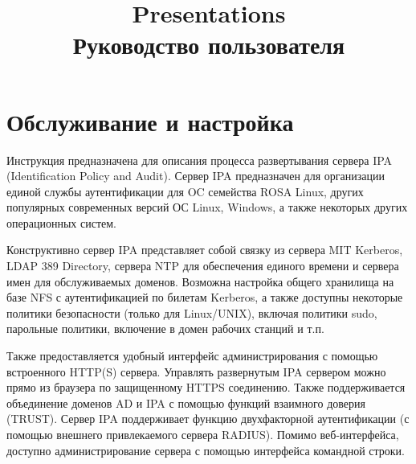 \documentclass[a4paper,10pt,twoside]{article}
\title{Presentations\\ Руководство пользователя}
\author{}
\date{}
\begin{document}
	\section{Обслуживание и настройка}

Инструкция предназначена для описания процесса развертывания сервера IPA (Identification Policy and Audit). Сервер IPA предназначен для организации единой службы аутентификации для OC семейства ROSA Linux, других популярных современных версий ОС Linux, Windows, а также некоторых других операционных систем.

Конструктивно сервер IPA представляет собой связку из сервера MIT Kerberos, LDAP 389 Directory, сервера NTP для обеспечения единого времени и сервера имен для обслуживаемых доменов. Возможна настройка общего хранилища на базе NFS с аутентификацией по билетам Kerberos, а также доступны некоторые политики безопасности (только для Linux/UNIX), включая политики sudo, парольные политики, включение в домен рабочих станций и т.п.

Также предоставляется удобный интерфейс администрирования с помощью встроенного HTTP(S) сервера. Управлять развернутым IPA сервером можно прямо из браузера по защищенному HTTPS соединению. Также поддерживается объединение доменов AD и IPA с помощью функций взаимного доверия (TRUST). Сервер IPA поддерживает функцию двухфакторной аутентификации (с помощью внешнего привлекаемого сервера RADIUS). Помимо веб-интерфейса, доступно администрирование сервера с помощью интерфейса командной строки.
\end{document}

